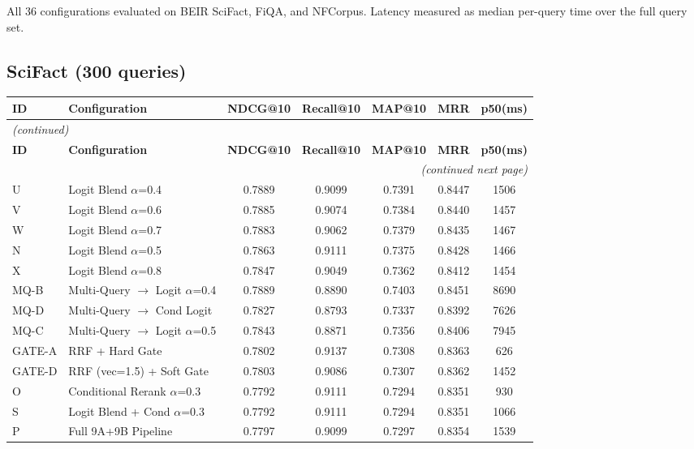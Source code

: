 \documentclass[11pt]{article}
\begin{document}
All 36 configurations evaluated on BEIR SciFact, FiQA, and NFCorpus. Latency measured as median per-query time over the full query set.

\subsection{SciFact (300 queries)}

\begin{longtable}{llccccc}
\toprule
\textbf{ID} & \textbf{Configuration} & \textbf{NDCG@10} & \textbf{Recall@10} & \textbf{MAP@10} & \textbf{MRR} & \textbf{p50(ms)} \\
\midrule
\endfirsthead
\multicolumn{7}{l}{\emph{(continued)}} \\
\toprule
\textbf{ID} & \textbf{Configuration} & \textbf{NDCG@10} & \textbf{Recall@10} & \textbf{MAP@10} & \textbf{MRR} & \textbf{p50(ms)} \\
\midrule
\endhead
\midrule
\multicolumn{7}{r}{\emph{(continued next page)}} \\
\endfoot
\bottomrule
\endlastfoot
U & Logit Blend $\alpha$=0.4 & 0.7889 & 0.9099 & 0.7391 & 0.8447 & 1506 \\
V & Logit Blend $\alpha$=0.6 & 0.7885 & 0.9074 & 0.7384 & 0.8440 & 1457 \\
W & Logit Blend $\alpha$=0.7 & 0.7883 & 0.9062 & 0.7379 & 0.8435 & 1467 \\
N & Logit Blend $\alpha$=0.5 & 0.7863 & 0.9111 & 0.7375 & 0.8428 & 1466 \\
X & Logit Blend $\alpha$=0.8 & 0.7847 & 0.9049 & 0.7362 & 0.8412 & 1454 \\
MQ-B & Multi-Query $\to$ Logit $\alpha$=0.4 & 0.7889 & 0.8890 & 0.7403 & 0.8451 & 8690 \\
MQ-D & Multi-Query $\to$ Cond Logit & 0.7827 & 0.8793 & 0.7337 & 0.8392 & 7626 \\
MQ-C & Multi-Query $\to$ Logit $\alpha$=0.5 & 0.7843 & 0.8871 & 0.7356 & 0.8406 & 7945 \\
GATE-A & RRF + Hard Gate & 0.7802 & 0.9137 & 0.7308 & 0.8363 & 626 \\
GATE-D & RRF (vec=1.5) + Soft Gate & 0.7803 & 0.9086 & 0.7307 & 0.8362 & 1452 \\
O & Conditional Rerank $\alpha$=0.3 & 0.7792 & 0.9111 & 0.7294 & 0.8351 & 930 \\
S & Logit Blend + Cond $\alpha$=0.3 & 0.7792 & 0.9111 & 0.7294 & 0.8351 & 1066 \\
P & Full 9A+9B Pipeline & 0.7797 & 0.9099 & 0.7297 & 0.8354 & 1539 \\

\end{longtable}
\end{document}
